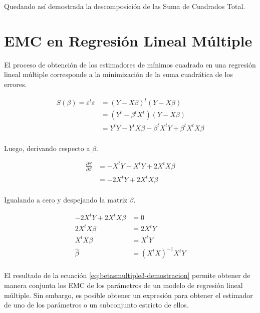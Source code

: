 \documentclass[
  11pt,
]{book}
\theoremstyle{definition}
\theoremstyle{definition}
\theoremstyle{definition}
\theoremstyle{definition}
\theoremstyle{remark}
\begin{document}
Quedando así demostrada la descomposición de las Suma de Cuadrados Total.

\section{EMC en Regresión Lineal Múltiple}\label{RLM-EMC}

El proceso de obtención de los estimadores de mínimos cuadrado en una regresión lineal múltiple corresponde a la minimización de la suma cuadrática de los errores.

\begin{equation}
\begin{split}
S(\beta) = \varepsilon^t\varepsilon &= (Y - X\beta)^t(Y - X\beta)\\
&= (Y^t - \beta^tX^t)(Y - X\beta)\\
&= Y^tY - Y^tX\beta - \beta^tX^tY + \beta^tX^tX\beta\\
\end{split}
\label{eq:betasmultiple-demostracion}
\end{equation}

Luego, derivando respecto a \(\beta\).

\begin{equation}
\begin{split}
\frac{\partial S}{\partial \beta} &= - X^tY - X^tY + 2X^tX\beta\\
&= - 2X^tY + 2X^tX\beta\\
\end{split}
\label{eq:betasmultiple2-demostracion}
\end{equation}

Igualando a cero y despejando la matriz \(\beta\).

\begin{equation}
\begin{split}
- 2X^tY + 2X^tX\beta &= 0\\
2X^tX\beta &= 2X^tY\\
X^tX\beta &= X^tY\\
\widehat{\beta} &= (X^tX)^{-1}X^tY\\
\end{split}
\label{eq:betasmultiple3-demostracion}
\end{equation}

El resultado de la ecuación \eqref{eq:betasmultiple3-demostracion} permite obtener de manera conjunta los EMC de los parámetros de un modelo de regresión lineal múltiple. Sin embargo, es posible obtener un expresión para obtener el estimador de uno de los parámetros o un subconjunto estricto de ellos.
\end{document}

